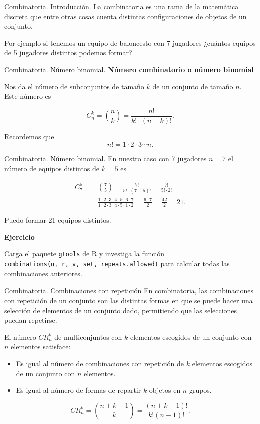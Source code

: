 \documentclass[
  ignorenonframetext,
  aspectratio=169]{beamer}
\providecommand{\tightlist}{%
  \setlength{\itemsep}{0pt}\setlength{\parskip}{0pt}}\usepackage{longtable,booktabs,array}
\begin{document}
\begin{frame}{Combinatoria. Introducción.}
\protect\hypertarget{combinatoria.-introducciuxf3n.}{}
La combinatoria es una rama de la matemática discreta que entre otras
cosas cuenta distintas configuraciones de objetos de un conjunto.

Por ejemplo si tenemos un equipo de baloncesto con 7 jugadores ¿cuántos
equipos de 5 jugadores distintos podemos formar?
\end{frame}

\begin{frame}{Combinatoria. Número binomial.}
\protect\hypertarget{combinatoria.-nuxfamero-binomial.}{}
\textbf{Número combinatorio o número binomial}

Nos da el número de subconjuntos de tamaño \(k\) de un conjunto de
tamaño \(n\). Este número es

\[
C_n^k={n\choose k} = \frac{n!}{k!\cdot (n-k)!}.
\]

Recordemos que \[
n!=1\cdot 2\cdot 3\cdots n.
\]
\end{frame}

\begin{frame}[fragile]{Combinatoria. Número binomial.}
\protect\hypertarget{combinatoria.-nuxfamero-binomial.-1}{}
En nuestro caso con 7 jugadores \(n=7\) el número de equipos distintos
de \(k=5\) es

\[
\begin{array}{rl}
C_7^5&={7\choose 5} = \frac{7!}{5!\cdot (7-5)!}=\frac{7!}{5!\cdot 2!} \\
&=\frac{1\cdot 2\cdot 3 \cdot 4\cdot 5\cdot 6\cdot 7}{1\cdot 2\cdot 3 \cdot 4\cdot 5\cdot 1\cdot 2}=\frac{6\cdot 7}{2}=\frac{42}{2}=21.
\end{array}
\]

Puedo formar 21 equipos distintos.

\textbf{Ejercicio}

Carga el paquete \texttt{gtools} de R y investiga la función
\texttt{combinations(n,\ r,\ v,\ set,\ repeats.allowed)} para calcular
todas las combinaciones anteriores.
\end{frame}

\begin{frame}{Combinatoria. Combinaciones con repetición}
\protect\hypertarget{combinatoria.-combinaciones-con-repeticiuxf3n}{}
En combinatoria, las combinaciones con repetición de un conjunto son las
distintas formas en que se puede hacer una selección de elementos de un
conjunto dado, permitiendo que las selecciones puedan repetirse.

El número \(CR_n^k\) de multiconjuntos con \(k\) elementos escogidos de
un conjunto con \(n\) elementos satisface:

\begin{itemize}
\tightlist
\item
  Es igual al número de combinaciones con repetición de \(k\) elementos
  escogidos de un conjunto con \(n\) elementos.
\item
  Es igual al número de formas de repartir \(k\) objetos en \(n\)
  grupos.
\end{itemize}

\[CR_n^k = \binom{n+k-1}{k} = \frac{(n+k-1)!}{k!(n-1)!}.\]
\end{frame}
\end{document}

